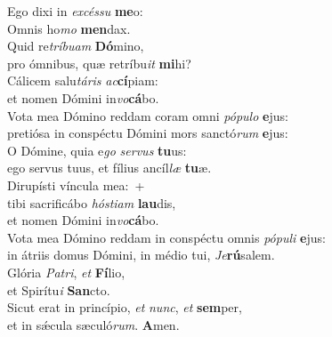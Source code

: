 \evenverse Ego dixi in \textit{ex}\textit{cés}\textit{su} \textbf{me}o:~\*\\
\evenverse Omnis ho\textit{mo} \textbf{men}dax.\\
\oddverse Quid re\textit{trí}\textit{bu}\textit{am} \textbf{Dó}mino,~\*\\
\oddverse pro ómnibus, quæ retríbu\textit{it} \textbf{mi}hi?\\
\evenverse Cálicem salu\textit{tá}\textit{ris} \textit{ac}\textbf{cí}piam:~\*\\
\evenverse et nomen Dómini in\textit{vo}\textbf{cá}bo.\\
\oddverse Vota mea Dómino reddam coram omni \textit{pó}\textit{pu}\textit{lo} \textbf{e}jus:~\*\\
\oddverse pretiósa in conspéctu Dómini mors sanctó\textit{rum} \textbf{e}jus:\\
\evenverse O Dómine, quia e\textit{go} \textit{ser}\textit{vus} \textbf{tu}us:~\*\\
\evenverse ego servus tuus, et fílius ancíl\textit{læ} \textbf{tu}æ.\\
\oddverse Dirupísti víncula mea:~+\\
\oddverse  tibi sacrificábo \textit{hó}\textit{sti}\textit{am} \textbf{lau}dis,~\*\\
\oddverse et nomen Dómini in\textit{vo}\textbf{cá}bo.\\
\evenverse Vota mea Dómino reddam in conspéctu omnis \textit{pó}\textit{pu}\textit{li} \textbf{e}jus:~\*\\
\evenverse in átriis domus Dómini, in médio tui, \textit{Je}\textbf{rú}salem.\\
\oddverse Glória \textit{Pa}\textit{tri}, \textit{et} \textbf{Fí}lio,~\*\\
\oddverse et Spirítu\textit{i} \textbf{San}cto.\\
\evenverse Sicut erat in princípio, \textit{et} \textit{nunc}, \textit{et} \textbf{sem}per,~\*\\
\evenverse et in sǽcula sæculó\textit{rum}. \textbf{A}men.\\
